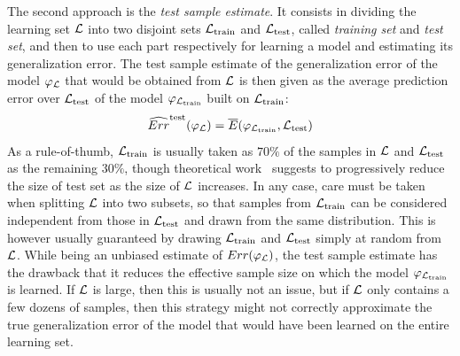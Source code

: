 The second approach is the \textit{test sample estimate}. It consists in
dividing the learning set ${\cal L}$ into two disjoint sets ${\cal
L}_\text{train}$ and ${\cal L}_\text{test}$, called \textit{training set} and
\textit{test set}, and then to use each part respectively for learning a model
and estimating its generalization error. The test sample estimate of the
generalization error of the model $\varphi_{\cal L}$ that would be obtained from ${\cal
L}$ is then given as the average prediction error over ${\cal L}_\text{test}$
of the model $\varphi_{{\cal L}_\text{train}}$ built on ${\cal L}_\text{train}$:
\begin{equation}\label{eqn:test-error}
\widehat{Err}^\text{test}(\varphi_{\cal L}) = \overline{E}(\varphi_{{\cal L}_\text{train}}, {\cal L}_\text{test})
\end{equation}
As a rule-of-thumb,
${\cal L}_\text{train}$ is usually taken as $70\%$ of the samples in
${\cal L}$ and ${\cal L}_\text{test}$ as the remaining $30\%$, though
theoretical work~\citep{guyon:1997} suggests to progressively reduce the size of test set as
the size of ${\cal L}$ increases. In any case, care must be taken when splitting ${\cal
L}$ into two subsets, so that samples from ${\cal L}_\text{train}$ can be
considered independent from those in ${\cal L}_\text{test}$ and drawn from the
same distribution. This is however usually guaranteed by drawing ${\cal
L}_\text{train}$ and ${\cal L}_\text{test}$ simply at random from ${\cal L}$.
While being an unbiased estimate of $Err(\varphi_{\cal L})$, the test sample
estimate has the drawback that it reduces the
effective sample size on which the model $\varphi_{{\cal L}_\text{train}}$ is learned. If ${\cal L}$ is large,
then this is usually not an issue, but if ${\cal L}$ only contains a few dozens
of samples, then this strategy might not correctly approximate the true
generalization error of the model that would have been learned on the entire learning set.

